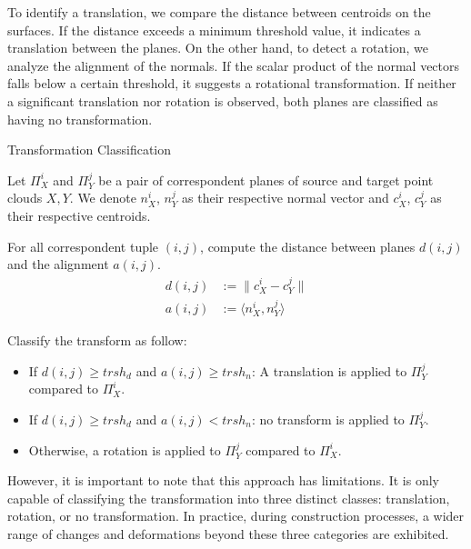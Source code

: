 To identify a translation, we compare the distance between centroids on the surfaces. If the distance exceeds a minimum threshold value, it indicates a translation between the planes. On the other hand, to detect a rotation, we analyze the alignment of the normals. If the scalar product of the normal vectors falls below a certain threshold, it suggests a rotational transformation. If neither a significant translation nor rotation is observed, both planes are classified as having no transformation.\\

\begin{algorithm}[ht]
\caption{Transformation Classification}\label{alg:Transf_Class}
\begin{description}[leftmargin=!, labelwidth=\widthof{\textbf{Step1: }}]
    \item [Step 1:] Let $\Pi_X^i$ and $\Pi_Y^j$ be a pair of correspondent planes of source and target point clouds $X, Y$. We denote $n_X^i$, $n_Y^j$ as their respective normal vector and $c_X^i$, $c_Y^j$ as their respective centroids.
    \item [Step 2:] For all correspondent tuple $(i,j)$, compute the distance between planes $d(i,j) $ and the alignment $a(i,j)$.
    \begin{align*}
        d(i,j) &:= \| c_X^i - c_Y^j \| \\
        a(i,j) &:= \langle n_X^i, n_Y^j\rangle
    \end{align*}
    \item [Step 3:] Classify the transform as follow:
    \begin{itemize}
        \item If $d(i,j) \geq trsh_d$ and $a(i,j) \geq trsh_n$: A translation is applied to $\Pi_Y^j$ compared to $\Pi_X^i$.
        \item If $d(i,j) \geq trsh_d$ and $a(i,j) < trsh_n$: no transform is applied to $\Pi_Y^j$.
        \item Otherwise, a rotation is applied to $\Pi_Y^j$ compared to $\Pi_X^i$.
    \end{itemize}
\end{description}
\end{algorithm}
However, it is important to note that this approach has limitations. It is only capable of classifying the transformation into three distinct classes: translation, rotation, or no transformation. In practice, during construction processes, a wider range of changes and deformations beyond these three categories are exhibited.